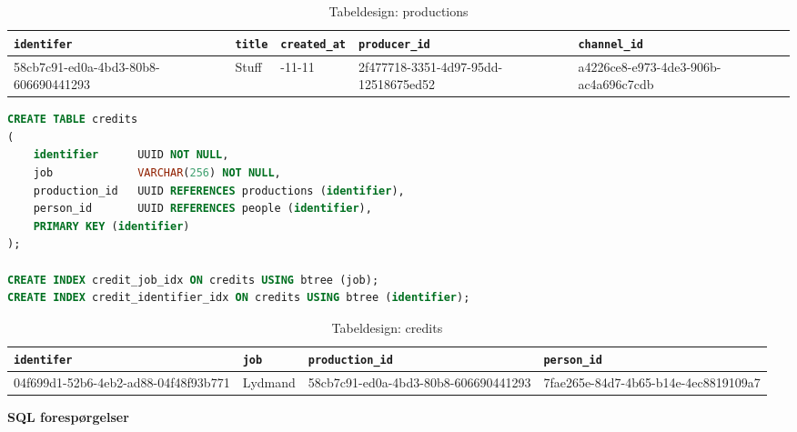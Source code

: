 \begin{table}[ht]
    \begin{tabularx}{\textwidth}{|>{\RaggedRight}X|>{\RaggedRight}X|>{\RaggedRight}X|>{\RaggedRight}X|>{\RaggedRight}X|}
        \hline
        \texttt{\textbf{identifer}} &  \texttt{\textbf{title}} & \texttt{\textbf{created\_at}} & \texttt{\textbf{producer\_id}} & \texttt{\textbf{channel\_id}}\\
        \hline
        58cb7c91-ed0a-4bd3-80b8-606690441293 & Stuff & 2008-11-11 & 2f477718-3351-4d97-95dd-12518675ed52 &  a4226ce8-e973-4de3-906b-ac4a696c7cdb\\
        \hline
    \end{tabularx}
    \caption{Tabeldesign: productions}
    \label{tab:productions_table}
\end{table}



\begin{lstlisting}[language=sql, caption=credits.sql]
CREATE TABLE credits
(
    identifier      UUID NOT NULL,
    job             VARCHAR(256) NOT NULL,
    production_id   UUID REFERENCES productions (identifier),
    person_id       UUID REFERENCES people (identifier),
    PRIMARY KEY (identifier)
);

CREATE INDEX credit_job_idx ON credits USING btree (job);
CREATE INDEX credit_identifier_idx ON credits USING btree (identifier);
\end{lstlisting}


\begin{table}[ht]
    \begin{tabularx}{\textwidth}{|>{\RaggedRight}X|>{\RaggedRight}X|>{\RaggedRight}X|>{\RaggedRight}X|}
        \hline
        \texttt{\textbf{identifer}} &  \texttt{\textbf{job}} & \texttt{\textbf{production\_id}} & \texttt{\textbf{person\_id}}\\
        \hline
        04f699d1-52b6-4eb2-ad88-04f48f93b771 & Lydmand & 58cb7c91-ed0a-4bd3-80b8-606690441293 & 7fae265e-84d7-4b65-b14e-4ec8819109a7\\
        \hline
    \end{tabularx}
    \caption{Tabeldesign: credits}
    \label{tab:credits_table}
\end{table}

{\large\textbf{SQL forespørgelser}}\\

